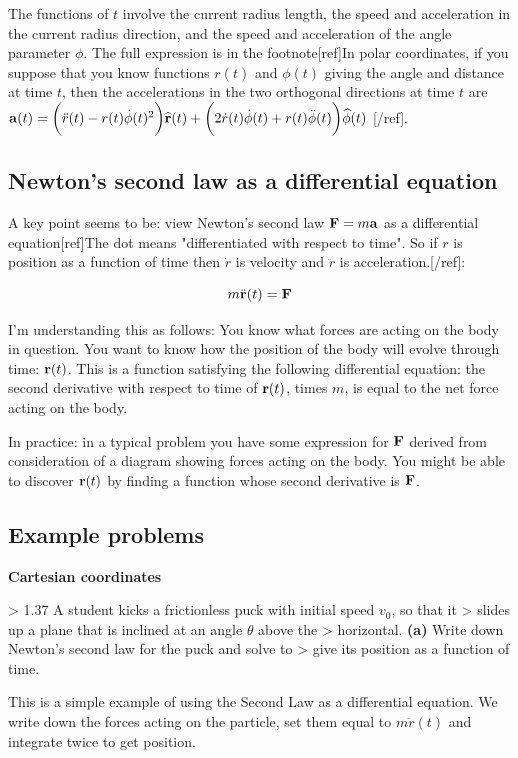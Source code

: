 The functions of $t$ involve the current radius length, the speed and
acceleration in the current radius direction, and the speed and acceleration of
the angle parameter $\phi$. The full expression is in the footnote[ref]In polar
coordinates, if you suppose that you know functions $r(t)$ and $\phi(t)$ giving
the angle and distance at time $t$, then the accelerations in the two
orthogonal directions at time $t$ are
$\mathbf{a}(t) = \bigg( \ddot r(t) - r(t) \dot\phi(t)^2 \bigg) \mathbf{\widehat{r}}(t) + \bigg( 2\dot r(t) \dot \phi(t) + r(t) \ddot \phi(t)\bigg) \mathbf{\widehat{\phi}}(t)$
[/ref].


\subsection{Newton's second law as a differential equation}

A key point seems to be: view Newton's second law $\mathbf{F} = m\mathbf{a}$ as a differential
equation[ref]The dot means "differentiated with respect to time". So if $r$ is
position as a function of time then $\dot r$ is velocity and $\ddot r$ is
acceleration.[/ref]:

$$m \ddot {\mathbf{r}}(t) = \mathbf{F}$$

I'm understanding this as follows: You know what forces are acting on the body
in question. You want to know how the position of the body will evolve through
time: $\mathbf{r}(t)$. This is a function satisfying the following differential
equation: the second derivative with respect to time of $\mathbf{r}(t)$, times $m$, is
equal to the net force acting on the body.

In practice: in a typical problem you have some expression for $\mathbf{F}$ derived from
consideration of a diagram showing forces acting on the body. You might be able
to discover $\mathbf{r}(t)$ by finding a function whose second derivative is $\mathbf{F}$.

\subsection{Example problems}

\textbf{Cartesian coordinates}

> 1.37 A student kicks a frictionless puck with initial speed $v_0$, so that it
> slides up a plane that is inclined at an angle $\theta$ above the
> horizontal. \textbf{(a)} Write down Newton's second law for the puck and solve to
> give its position as a function of time.

This is a simple example of using the Second Law as a differential equation. We
write down the forces acting on the particle, set them equal to $m\ddot r(t)$
and integrate twice to get position.

